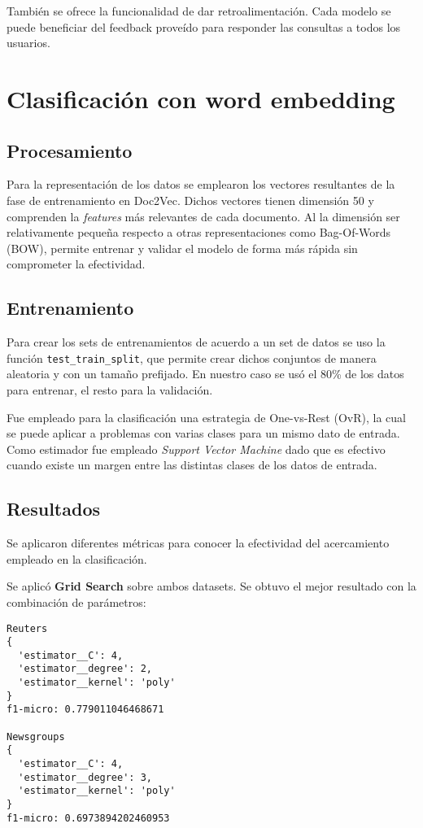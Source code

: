 \documentclass[12pt]{llncs}
\begin{document}
También se ofrece la funcionalidad de dar retroalimentación. Cada modelo se puede beneficiar del feedback proveído para responder las consultas a todos los usuarios.

\section{Clasificación con word embedding}

\subsection {Procesamiento}

Para la representación de los datos se emplearon los vectores resultantes de la fase de entrenamiento en Doc2Vec. Dichos vectores tienen dimensión 50 y comprenden la \textit{features} más relevantes de cada documento. Al la dimensión ser relativamente pequeña respecto a otras representaciones como Bag-Of-Words (BOW), permite entrenar y validar el modelo de forma más rápida sin comprometer la efectividad.

\subsection {Entrenamiento}

Para crear los sets de entrenamientos de acuerdo a un set de datos se uso la función \verb+test_train_split+, que permite crear dichos conjuntos de manera aleatoria y con un tamaño prefijado. En nuestro caso se usó el 80\% de los datos para entrenar, el resto para la validación.

Fue empleado para la clasificación una estrategia de One-vs-Rest (OvR), la cual se puede aplicar a problemas con varias clases para un mismo dato de entrada. Como estimador fue empleado \textit{Support Vector Machine} dado que es efectivo cuando existe un margen entre las distintas clases de los datos de entrada.

\subsection {Resultados}

Se aplicaron diferentes métricas para conocer la efectividad del acercamiento empleado en la clasificación.

Se aplicó \textbf{Grid Search} sobre ambos datasets. Se obtuvo el mejor resultado con la combinación de parámetros:

\begin{verbatim}
Reuters
{
  'estimator__C': 4,
  'estimator__degree': 2,
  'estimator__kernel': 'poly'
}
f1-micro: 0.779011046468671

Newsgroups
{
  'estimator__C': 4,
  'estimator__degree': 3,
  'estimator__kernel': 'poly'
}
f1-micro: 0.6973894202460953
\end{verbatim}
\end{document}
